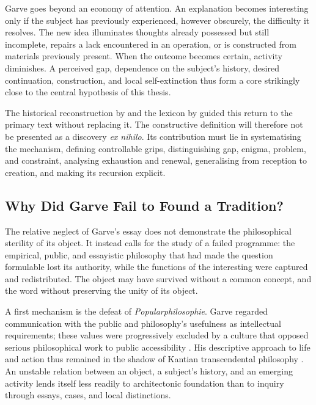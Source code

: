 \documentclass[11pt,a4paper]{article}
\begin{document}
Garve goes beyond an economy of attention. An explanation becomes interesting
only if the subject has previously experienced, however obscurely, the
difficulty it resolves. The new idea illuminates thoughts already possessed but
still incomplete, repairs a lack encountered in an operation, or is constructed
from materials previously present. When the outcome becomes certain, activity
diminishes. A perceived gap, dependence on the subject's history, desired
continuation, construction, and local self-extinction thus form a core strikingly
close to the central hypothesis of this thesis.

The historical reconstruction by \textcite{nannini2018garve} and the lexicon by
\textcite{nannini2018interesting} guided this return to the primary text without
replacing it. The constructive definition will therefore not be presented as a
discovery \emph{ex nihilo}. Its contribution must lie in systematising the
mechanism, defining controllable grips, distinguishing gap, enigma, problem, and
constraint, analysing exhaustion and renewal, generalising from reception to
creation, and making its recursion explicit.

\subsection{Why Did Garve Fail to Found a Tradition?}

The relative neglect of Garve's essay does not demonstrate the philosophical
sterility of its object. It instead calls for the study of a failed programme:
the empirical, public, and essayistic philosophy that had made the question
formulable lost its authority, while the functions of the interesting were
captured and redistributed. The object may have survived without a common
concept, and the word without preserving the unity of its object.

A first mechanism is the defeat of \emph{Popularphilosophie}. Garve regarded
communication with the public and philosophy's usefulness as intellectual
requirements; these values were progressively excluded by a culture that
opposed serious philosophical work to public accessibility
\parencite{thompson2018garve}. His descriptive approach to life and action thus
remained in the shadow of Kantian transcendental philosophy
\parencite{bachmannmedick2008anziehungskraft}. An unstable relation between an
object, a subject's history, and an emerging activity lends itself less readily
to architectonic foundation than to inquiry through essays, cases, and local
distinctions.
\end{document}
